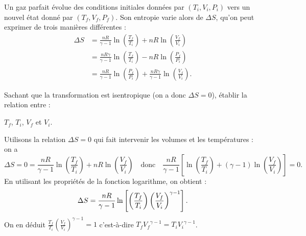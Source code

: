 \hauteurLargeurCadreReponse		{9mm}{5cm}
\typeEntrainement				{} %
\initialisationEntrainement


\debutEntrainement


Un gaz parfait évolue des conditions initiales données par $(T_i,V_i,P_i)$ vers un nouvel état donné par $(T_f,V_f,P_f)$. 
Son entropie varie alors de $\Delta S$, qu'on peut exprimer de trois manières différentes : 
\begin{align*}
\Delta S
&=\frac{nR}{\gamma-1}\ln\left(\frac{T_f}{T_i}\right)+nR\ln\left(\frac{V_f}{V_i}\right)\\[2mm]
&=\frac{nR\gamma}{\gamma-1}\ln\left(\frac{T_f}{T_i}\right)-nR\ln\left(\frac{P_f}{P_i}\right)\\[2mm]
&=\frac{nR}{\gamma-1}\ln\left(\frac{P_f}{P_i}\right)+\frac{nR\gamma}{\gamma-1}\ln\left(\frac{V_f}{V_i}\right).
\end{align*}


Sachant que la transformation est isentropique (on a donc $\Delta S=0$), établir la relation entre : 



\begin{enonce}
$T_f$, $T_i$, $V_f$ et $V_i$.
\end{enonce}

\begin{corrige}
Utilisons la relation $\Delta S=0$ qui fait intervenir les volumes et les températures : on a
\[
\Delta S=0=
\frac{nR}{\gamma-1}\ln\left(\frac{T_f}{T_i}\right)+nR\ln\left(\frac{V_f}{V_i}\right)
\quad\text{donc}\quad
\frac{nR}{\gamma-1}\left[\ln\left(\frac{T_f}{T_i}\right)+(\gamma-1)\ln\left(\frac{V_f}{V_i}\right)\right]=0.
\]
En utilisant les propriétés de la fonction logarithme, on obtient : \vspace{-0.5mm}
\[
\Delta S=
\frac{nR}{\gamma-1}\ln\left[\left(\frac{T_f}{T_i}\right)\left(\frac{V_f}{V_i}\right)^{\gamma-1}\right].
\vspace{-2mm}
\]
On en déduit $\frac{T_f}{T_i}\left(\frac{V_f}{V_i}\right)^{\gamma-1}=1$
c'est-à-dire $T_f{V_f}^{\gamma-1}=T_i{V_i}^{\gamma-1}$.
\end{corrige}

